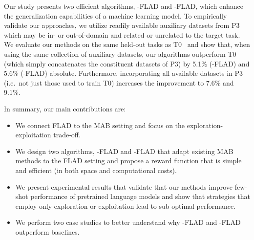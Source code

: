 Our study presents two efficient algorithms, \ex{}-FLAD and \ucb{}-FLAD, which enhance the generalization capabilities of a machine learning model. To empirically validate our approaches, we utilize readily available auxiliary datasets from P3 \citep{bach-etal-2022-promptsource} which may be in- or out-of-domain and related or unrelated to the target task. We evaluate our methods on the same held-out tasks as T0~\citep{sanh2022multitask} and show that, when using the same collection of auxiliary datasets, our algorithms outperform T0 (which simply concatenates the constituent datasets of P3) by 5.1\% (\ex{}-FLAD) and 5.6\% (\ucb{}-FLAD) absolute. Furthermore, incorporating all available datasets in P3 (i.e.\ not just those used to train T0) increases the improvement to 7.6\% and 9.1\%.


In summary, our main contributions are:
\begin{itemize}[nosep]
    \item We connect FLAD to the MAB setting and focus on the exploration-exploitation trade-off.
    \item We design two algorithms, \ex{}-FLAD and \ucb{}-FLAD that adapt existing MAB methods to the FLAD setting and propose a reward function that is simple and efficient (in both space and computational costs). 
    \item We present experimental results that validate that our methods improve few-shot performance of pretrained language models and show that strategies that employ only exploration or exploitation lead to sub-optimal performance.
    \item We perform two case studies to better understand why \ex{}-FLAD and \ucb{}-FLAD outperform baselines.
\end{itemize}